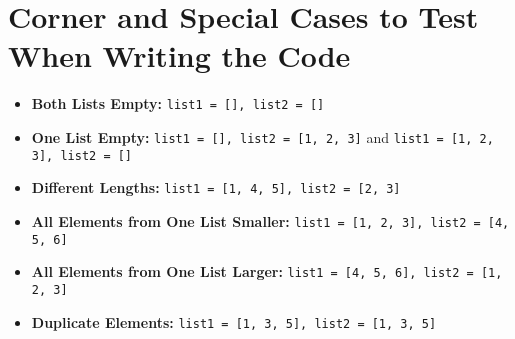 \section*{Corner and Special Cases to Test When Writing the Code}
\begin{itemize}
    \item \textbf{Both Lists Empty:} \texttt{list1 = [], list2 = []}
    \item \textbf{One List Empty:} \texttt{list1 = [], list2 = [1, 2, 3]} and \texttt{list1 = [1, 2, 3], list2 = []}
    \item \textbf{Different Lengths:} \texttt{list1 = [1, 4, 5], list2 = [2, 3]}
    \item \textbf{All Elements from One List Smaller:} \texttt{list1 = [1, 2, 3], list2 = [4, 5, 6]}
    \item \textbf{All Elements from One List Larger:} \texttt{list1 = [4, 5, 6], list2 = [1, 2, 3]}
    \item \textbf{Duplicate Elements:} \texttt{list1 = [1, 3, 5], list2 = [1, 3, 5]}
\end{itemize}

\printindex